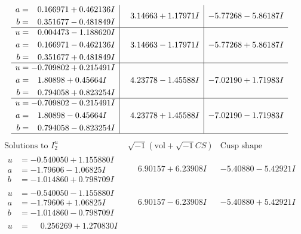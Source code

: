 \documentclass[1p]{elsarticle_modified}
\theoremstyle{definition}
\newcommand{\I}{\sqrt{-1}}
\begin{document}
$$\begin{array}{c|c|c}
\begin{aligned}
a &= \phantom{-}0.166971 + 0.462136 I \\
b &= \phantom{-}0.351677 - 0.481849 I\end{aligned}
 & \phantom{-}3.14663 + 1.17971 I & -5.77268 - 5.86187 I \\ \hline\begin{aligned}
u &= \phantom{-}0.004473 - 1.188620 I \\
a &= \phantom{-}0.166971 - 0.462136 I \\
b &= \phantom{-}0.351677 + 0.481849 I\end{aligned}
 & \phantom{-}3.14663 - 1.17971 I & -5.77268 + 5.86187 I \\ \hline\begin{aligned}
u &= -0.709802 + 0.215491 I \\
a &= \phantom{-}1.80898 + 0.45664 I \\
b &= \phantom{-}0.794058 + 0.823254 I\end{aligned}
 & \phantom{-}4.23778 - 1.45588 I & -7.02190 + 1.71983 I \\ \hline\begin{aligned}
u &= -0.709802 - 0.215491 I \\
a &= \phantom{-}1.80898 - 0.45664 I \\
b &= \phantom{-}0.794058 - 0.823254 I\end{aligned}
 & \phantom{-}4.23778 + 1.45588 I & -7.02190 - 1.71983 I\\
 \hline 
 \end{array}$$\newpage$$\begin{array}{c|c|c}  
\text{Solutions to }I^u_{2}& \I (\text{vol} + \sqrt{-1}CS) & \text{Cusp shape}\\
 \hline 
\begin{aligned}
u &= -0.540050 + 1.155880 I \\
a &= -1.79606 - 1.06825 I \\
b &= -1.014860 + 0.798709 I\end{aligned}
 & \phantom{-}6.90157 + 6.23908 I & -5.40880 - 5.42921 I \\ \hline\begin{aligned}
u &= -0.540050 - 1.155880 I \\
a &= -1.79606 + 1.06825 I \\
b &= -1.014860 - 0.798709 I\end{aligned}
 & \phantom{-}6.90157 - 6.23908 I & -5.40880 + 5.42921 I \\ \hline\begin{aligned}
u &= \phantom{-}0.256269 + 1.270830 I \\

\end{aligned}
\end{array}$$
\end{document}
